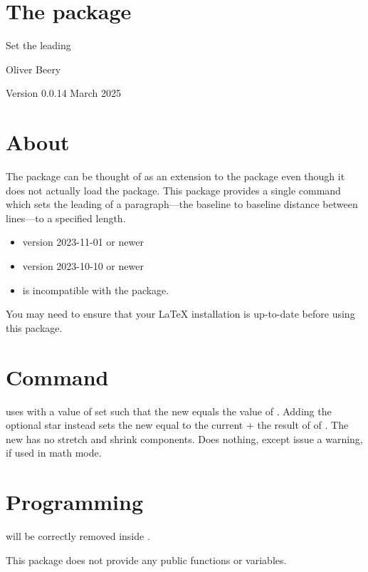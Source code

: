 \documentclass{beery}
\begin{document}
\section*
  {%
    The  package%
  }

Set the leading

Oliver Beery

Version 0.0.1\quad{}4 March 2025


\section{About}
\label{sec:about}

The  package can be thought of as an extension to the  package even though it does not actually load the  package.
This package provides a single command  which sets the leading of a paragraph---the baseline to baseline distance between lines---to a specified length.

\begin{itemize}
  \item \LaTeXe{} version 2023-11-01 or newer
  \item {} version 2023-10-10 or newer
  \item {} is incompatible with the  package.
\end{itemize}

You may need to ensure that your \LaTeX{} installation is up-to-date before using this package.


\section{Command}
\label{sec:command}

\begin{displaycode}
   \sarg{} 
\end{displaycode}

 uses  with a value of  set such that the new  equals the value of .
Adding the optional star \sarg{} instead sets the new  equal to the current  + the result of of .
The new  has no stretch and shrink components.
Does nothing, except issue a warning, if used in math mode.


\section{Programming}
\label{sec:programming}

 will be correctly removed inside .

This package does not provide any public  functions or variables.
\end{document}
